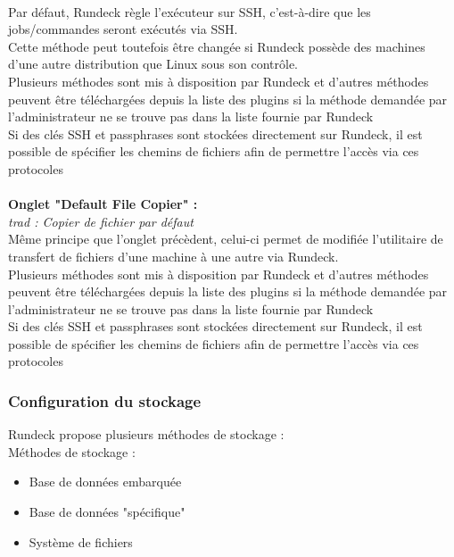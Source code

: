\documentclass[12pt]{article}
\begin{document}
\\
Par défaut, Rundeck règle l'exécuteur sur SSH, c'est-à-dire que les jobs/commandes seront exécutés via SSH. 
\\
Cette méthode peut toutefois être changée si Rundeck possède des machines d'une autre distribution que Linux sous son contrôle. 
\\
Plusieurs méthodes sont mis à disposition par Rundeck et d'autres méthodes peuvent être téléchargées depuis la liste des plugins si la méthode demandée par l'administrateur ne se trouve pas dans la liste fournie par Rundeck
\\
Si des clés SSH et passphrases sont stockées directement sur Rundeck, il est possible de spécifier les chemins de fichiers afin de permettre l'accès via ces protocoles
\\
\vspace{0.2cm}
\\
\textbf{Onglet "Default File Copier" :}
\\
\textit{trad : Copier de fichier par défaut}
\\
Même principe que l'onglet précèdent, celui-ci permet de modifiée l'utilitaire de transfert de fichiers d'une machine à une autre via Rundeck.
\\
Plusieurs méthodes sont mis à disposition par Rundeck et d'autres méthodes peuvent être téléchargées depuis la liste des plugins si la méthode demandée par l'administrateur ne se trouve pas dans la liste fournie par Rundeck
\\
Si des clés SSH et passphrases sont stockées directement sur Rundeck, il est possible de spécifier les chemins de fichiers afin de permettre l'accès via ces protocoles

\subsubsection{Configuration du stockage}

Rundeck propose plusieurs méthodes de stockage :
\vspace{0.2cm}
\\
Méthodes de stockage :
\begin{itemize}
    \item Base de données embarquée
    \item Base de données "spécifique"
    \item Système de fichiers
\end{itemize}
\end{document}
